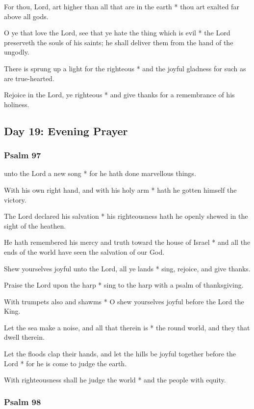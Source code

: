 For thou, Lord, art higher than all that are in the earth * thou art exalted far above all gods.

O ye that love the Lord, see that ye hate the thing which is evil * the Lord preserveth the souls of his saints; he shall deliver them from the hand of the ungodly.

There is sprung up a light for the righteous * and the joyful gladness for such as are true-hearted.

Rejoice in the Lord, ye righteous * and give thanks for a remembrance of his holiness.

\subsection{Day 19: Evening Prayer}

\subsubsection{Psalm 97}


 unto the Lord a new song * for he hath done marvellous things.

With his own right hand, and with his holy arm * hath he gotten himself the victory.

The Lord declared his salvation * his righteousness hath he openly shewed in the sight of the heathen.

He hath remembered his mercy and truth toward the house of Israel * and all the ends of the world have seen the salvation of our God.

Shew yourselves joyful unto the Lord, all ye lands * sing, rejoice, and give thanks.

Praise the Lord upon the harp * sing to the harp with a psalm of thanksgiving.

With trumpets also and shawms * O shew yourselves joyful before the Lord the King.

Let the sea make a noise, and all that therein is * the round world, and they that dwell therein.

Let the floods clap their hands, and let the hills be joyful together before the Lord * for he is come to judge the earth.

With righteousness shall he judge the world * and the people with equity.

\subsubsection{Psalm 98}

